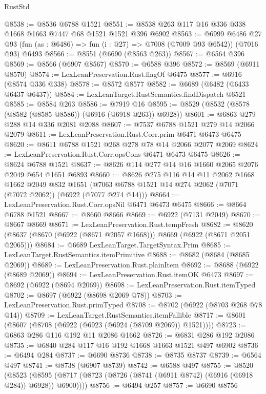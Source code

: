 \begin{lexlean}{RustStd}
\begin{coremodule}
@8538 := @8536 @6788 @1521
@8551 := @8538 @263 @117 @16 @336 @338 @1668 @1663 @7447 @68 @1521 @1521 @396 @6902
@8563 := @6999
    @6486
    @27
    @93
    (fun (as : @6486) => fun (i : @27) => @7008 (@7009 @93 @6542))
    (@7016 @93)
    @6493
@8566 := @8551 (@6690 (@8563 @263))
@8567 := @6564 @396
@8569 := @8566 (@6907 @8567)
@8570 := @6588 @396
@8572 := @8569 (@6911 @8570)
@8574 := LexLeanPreservation.Rust.flagOf @6475
@8577 := @6916 (@8574 @336 @338)
@8578 := @8572 @8577
@8582 := @6689 (@6482 (@6433 @6437 @6437))
@8584 := LexLeanTarget.RustSemantics.findDispatch @6521
@8585 := @8584 @263
@8586 := @7919 @16
@8595 := @8529 (@8532 (@8578 (@8582 (@8585 @8586)) (@6916 (@6918 @263)) @6928))
@8601 := @6863 @279 @288 @14 @336 @2081 @2088
@8607 := @7537 @6788 @1521 @279 @14 @2066 @2079
@8611 := LexLeanPreservation.Rust.Corr.prim @6471 @6473 @6475
@8620 := @8611 @6788 @1521 @268 @278 @78 @14 @2066 @2077 @2069
@8624 := LexLeanPreservation.Rust.Corr.opsCons @6471 @6473 @6475
@8626 := @8624 @6788 @1521
@8637 := @8626 @114 @277 @14 @16 @1660 @2065 @2076 @2049 @654 @1651 @6893
@8660 := @8626
    @275
    @116
    @14
    @11
    @2062
    @1668
    @1662
    @2049
    @832
    @1651
    (@7063 @6788 @1521 @14 @274 @2062 (@7071 (@7072 @2062)) (@6922 (@7077 @274 @14)))
@8664 := LexLeanPreservation.Rust.Corr.opsNil @6471 @6473 @6475
@8666 := @8664 @6788 @1521
@8667 := @8660 @8666
@8669 := @6922 (@7131 @2049)
@8670 := @8667 @8669
@8671 := LexLeanPreservation.Rust.tempFresh
@8682 := @8620 (@8637 (@8670 (@6922 (@8671 @2057 @1668))) @8669 (@6922 (@8671 @2051 @2065)))
@8684 := @6689 LexLeanTarget.TargetSyntax.Prim
@8685 := LexLeanTarget.RustSemantics.itemPrimitive
@8688 := @8682 (@8684 (@8685 @2069))
@8689 := LexLeanPreservation.Rust.plainItem
@8692 := @8688 (@6922 (@8689 @2069))
@8694 := LexLeanPreservation.Rust.itemOK @6473
@8697 := @8692 (@6922 (@8694 @2069))
@8698 := LexLeanPreservation.Rust.itemTyped
@8702 := @8697 (@6922 (@8698 @2069 @78))
@8703 := LexLeanPreservation.Rust.primTyped
@8708 := @8702 (@6922 (@8703 @268 @78 @14))
@8709 := LexLeanTarget.RustSemantics.itemFallible
@8717 := @8601 (@8607 (@8708 (@6922 (@6923 (@6924 (@8709 @2069)) @1521))))
@8723 := @6863 @286 @116 @192 @11 @2086 @1662
@8726 := @6831 @286 @192 @2086
@8735 := @6840 @284 @117 @16 @192 @1668 @1663 @1521 @497 @6902
@8736 := @6494 @284
@8737 := @6690 @8736
@8738 := @8735 @8737
@8739 := @6564 @497
@8741 := @8738 (@6907 @8739)
@8742 := @6588 @497
@8755 := @8520
    (@8523 (@8595 (@8717 (@8723 (@8726 (@8741 (@6911 @8742) (@6916 (@6918 @284)) @6928)) @6900))))
@8756 := @6494 @257
@8757 := @6690 @8756

\end{coremodule}
\end{lexlean}
